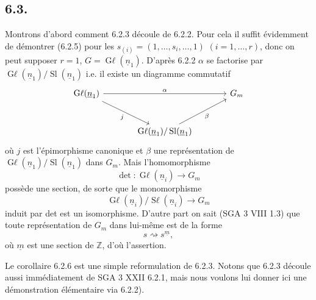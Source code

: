 \documentclass{article}
\begin{document}
\clearpage
\subsection*{6.3.}
Montrons d'abord comment 6.2.3 découle de 6.2.2. Pour cela il suffit évidemment de démontrer (6.2.5) pour les
\(s_{(i)}=(1,\ldots,s_i,\ldots,1)\) \((i=1,\ldots,r)\), donc on peut supposer \(r=1\), \(G=\operatorname{G\ell}(\underline{n}_1)\). D'après 6.2.2 \(\alpha\) se factorise par \(\operatorname{G\ell}(\underline{n}_1)/\operatorname{Sl}(\underline{n}_1)\) i.e. il existe un diagramme commutatif
\[
\begin{tikzcd}[column sep=large,row sep=large]
\operatorname{G\ell}(\underline{n}_1) \arrow[rr,"\alpha"] \arrow[dr,"j"'] && {G}_m\\
& \operatorname{G\ell}(\underline{n}_1)/\operatorname{Sl}(\underline{n}_1) \arrow[ur,"\beta"'] &
\end{tikzcd}
\]
où \(j\) est l'épimorphisme canonique et \(\beta\) une représentation de \(\operatorname{G\ell}(\underline{n}_1)/\operatorname{Sl}(\underline{n}_1)\) dans \({G}_m\). Mais l'homomorphisme
\[
 \det:\operatorname{G\ell}(\underline{n}_i)\longrightarrow{G}_m
\]
possède une section, de sorte que le monomorphisme
\[
 \operatorname{G\ell}(\underline{n}_i)/\operatorname{S\ell}(\underline{n}_i)\longrightarrow{G}_m
\]
induit par det est un isomorphisme. D'autre part on sait (SGA 3 VIII 1.3) que toute représentation de \({G}_m\) dans lui-même est de la forme
\[
 s\rightsquigarrow s^{\underline{m}},
\]
où \(\underline{m}\) est une section de \(\mathbb Z\), d'où l'assertion.

Le corollaire 6.2.6 est une simple reformulation de 6.2.3. Notons que 6.2.3 découle aussi immédiatement de SGA 3 XXII 6.2.1, mais nous voulons lui donner ici une démonstration élémentaire via 6.2.2).
\end{document}
